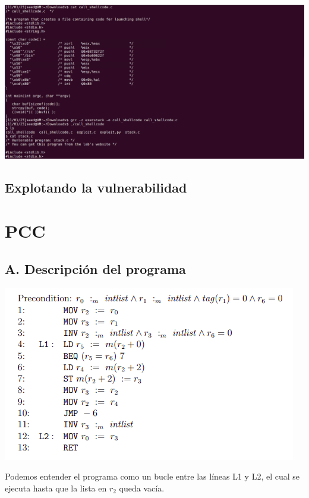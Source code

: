 \documentclass[11pt]{article}
\begin{document}
\begin{center}
\includegraphics[scale=0.4]{call_shellcode_exec.png}
\end{center}

\subsection{Explotando la vulnerabilidad}


\newpage

\section{PCC}

\subsection*{A. Descripción del programa}

\begin{center}
\includegraphics[scale=0.7]{progPCC.png}
\end{center}

Podemos entender el programa como un bucle entre las 
líneas L1 y L2, el cual se ejecuta hasta que la lista
en $r_2$ queda vacía.
\end{document}
